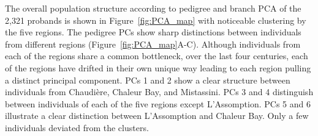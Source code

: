 The overall population structure according to pedigree and branch PCA
of the 2,321 probands is shown in Figure~\ref{fig:PCA_map}
with noticeable clustering by the five regions.
%
The pedigree PCs show sharp distinctions between individuals from different regions
(Figure~\ref{fig:PCA_map}A-C).
%
Although individuals from each of the regions share a common bottleneck,
over the last four centuries,
each of the regions have drifted in their own unique way
leading to each region pulling a distinct principal component.
%
PCs 1 and 2 show a clear structure between individuals from Chaudière, Chaleur Bay, and Mistassini.
%
PCs 3 and 4 distinguish between individuals of each of the five regions except L'Assomption.
%
PCs 5 and 6 illustrate a clear distinction between L'Assomption and Chaleur Bay.
%
Only a few individuals deviated from the clusters.

